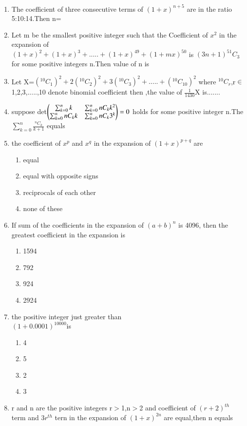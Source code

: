 \begin{enumerate}[label=\arabic*.,ref=\thesubsection.\theenumi]
\item The coefficient of three consecutive terms of $(1+x)^{n+5}$ are in the ratio 5:10:14.Then n=
\item Let m be the smallest positive integer such that the Coefficient of $x^2$ in the expansion of \\$(1+x)^2+(1+x)^3+.....+(1+x)^{49}+(1+mx)^{50}$ is $(3n+1)^{51}C_3$ for some positive integers n.Then value of n is
\item Let X=$(^{10}C_1)^2+2(^{10}C_2)^2+3(^{10}C_3)^2+.....+(^{10}C_{10})^2$ where $^{10}C_r$,r$\in$ {1,2,3,.....,10} denote binomial coefficient then ,the value of $\frac{1}{1430}$X is.......
\item suppose det$\begin{pmatrix}\sum_{k=0}^{n}k&\sum_{k=0}^{n} {n}C_k k^2\\\sum_{k=0}^{n} {n}C_k k&\sum_{k=0}^{n} {n}C_k 3^k\end{pmatrix}=0$ holds for some positive integer n.The $\sum_{k=0}^{n} \frac{^{n}C_k}{k+1}$ equals
\item the coefficient of $x^p$ and $x^q$ in the expansion of $(1+x)^{p+q}$ are
\begin{enumerate}
\item equal
\item equal with opposite signs
\item reciprocals of each other
\item none of these
\end {enumerate}
\item If sum of the coefficients in the expansion of $(a+b)^n$ is 4096, then the greatest coefficient in the expansion is 
\begin{enumerate}
\item 1594
\item 792
\item 924
\item 2924
\end{enumerate}
\item the positive integer just greater than \\$(1+0.0001)^{10000} $is 
\begin{enumerate}
\item 4
\item 5
\item 2
\item 3
\end{enumerate}
\item r and n are the positive integers r$>$1,n$>$2 and coefficient of $(r+2)^{th}$ term and $3r^{th}$ tern in the expansion of $(1+x)^{2n}$ are equal,then n equals
\begin{enumerate}

\end{enumerate}
\end{enumerate}
